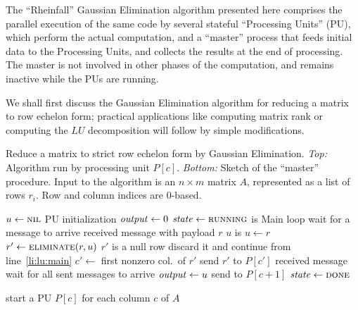 The ``Rheinfall'' Gaussian Elimination algorithm presented here
comprises the parallel execution of the same code by several stateful
``Processing Units'' (PU), which perform the actual computation, and a
``master'' process that feeds initial data to the Processing Units,
and collects the results at the end of processing.  The master is not
involved in other phases of the computation, and remains inactive
while the PUs are running.

We shall first discuss the Gaussian Elimination algorithm for reducing
a matrix to row echelon form; practical applications like
computing matrix rank or computing the $LU$ decomposition will follow 
by simple modifications.
\begin{Algorithm}
  \caption{Reduce a matrix to strict row echelon form by Gaussian
    Elimination. \emph{Top:} Algorithm run by processing unit $P[c]$.
    \emph{Bottom:} Sketch of the ``master'' procedure.  Input to the
    algorithm is an $n \times m$ matrix $A$, represented as a list of
    rows $r_i$. Row and column indices are $0$-based.}
  \label{alg:echelon}
  \begin{codebox}
    \li $u \gets \textnormal{\scshape nil}$ \RComment PU initialization
    \li $\id{output} \gets 0$
    \li $\id{state} \gets \const{running}$
    \li \While {} is           \label{li:lu:main}
    \RComment Main loop
    \li \Do wait for a message to arrive
    \li   \If received message  with payload $r$
    \li   \Then
    \li     \If $u$ is \nil
    \li     \Then 
              $u \gets r$
    \li     \Else \label{li:pu:elimination}
              $r' \gets \textnormal{\scshape eliminate}(r,u)$
    \li       \If $r'$ is a null row 
    \li       \Then
                discard it and continue from line~\ref{li:lu:main}
              \End %
    \li       $c' \gets$ first nonzero col.~of $r'$
    \li       send $r'$ to $P[c']$
            \End
    \li   \ElseIf received message 
    \li   \Then 
            wait for all sent messages to arrive
    \li     $\id{output} \gets u$                     \label{li:pu:result}
    \li     send  to $P[c+1]$
    \li     $\id{state} \gets \const{done}$
          \End%
        \End%
    \li \Return {}
    \end{codebox}
    \begin{codebox}
    \li start a PU $P[c]$ for each column $c$ of $A$  \label{li:master:start}

\end{codebox}
\end{Algorithm}
